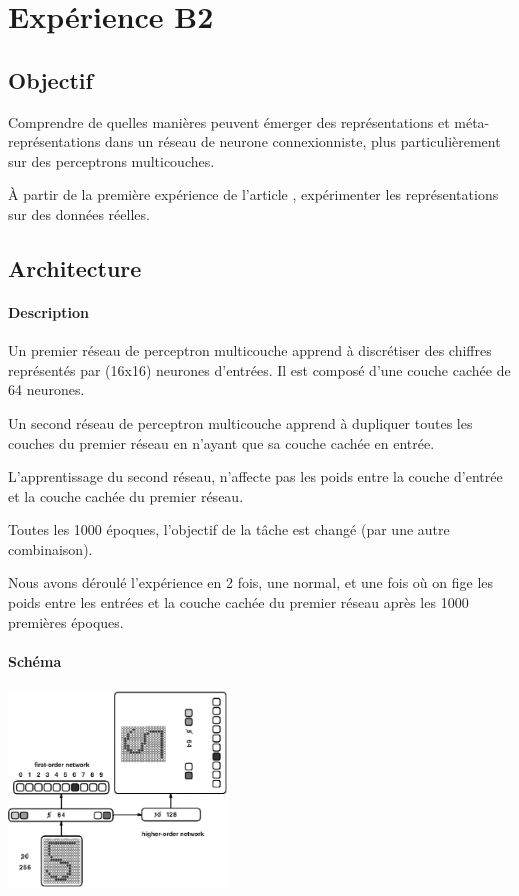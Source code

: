 \section{Expérience B2} \label{expB2}
  \subsection{Objectif}
    Comprendre de quelles manières peuvent émerger des représentations et méta-représentations dans 
    un réseau de neurone connexionniste, plus particulièrement sur des perceptrons multicouches.
    
    
    À partir de la première expérience de l'article \cite{Cleeremans_2007}, expérimenter les représentations
    sur des données réelles.
  
  \subsection{Architecture}
    \paragraph{Description}
      Un premier réseau de perceptron multicouche apprend à discrétiser des chiffres représentés
      par (16x16) neurones d'entrées. Il est composé d'une couche cachée de 64 neurones.
      
      Un second réseau de perceptron multicouche apprend à dupliquer toutes les couches du premier
      réseau en n'ayant que sa couche cachée en entrée.
      
      L'apprentissage du second réseau, n'affecte pas les poids entre la couche d'entrée et la 
      couche cachée du premier réseau.
      
      Toutes les 1000 époques, l'objectif de la tâche est changé (par une autre combinaison).
      
      Nous avons déroulé l'expérience en 2 fois, une normal, et une fois où on fige les poids
      entre les entrées et la couche cachée du premier réseau après les 1000 premières époques.
    \paragraph{Schéma}
      \begin{center}
	\includegraphics[width=220px]{data/expA3/schema.png}
      \end{center}
      

